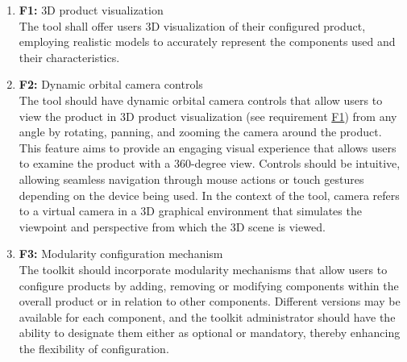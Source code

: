 \begin{enumerate}
\item \textbf{F1:} \label{itm:F1} 3D product visualization
\vspace{2pt}
\\The tool shall offer users 3D visualization of their configured product, employing realistic models to accurately represent the components used and their characteristics.
\vspace{4pt}

\item \textbf{F2:} \label{itm:F2} Dynamic orbital camera controls
\vspace{2pt}
\\The tool should have dynamic orbital camera controls that allow users to view the product in 3D product visualization (see requirement \hyperref[itm:F1]{F1}) from any angle by rotating, panning, and zooming the camera around the product. This feature aims to provide an engaging visual experience that allows users to examine the product with a 360-degree view. Controls should be intuitive, allowing seamless navigation through mouse actions or touch gestures depending on the device being used. In the context of the tool, camera refers to a virtual camera in a 3D graphical environment that simulates the viewpoint and perspective from which the 3D scene is viewed.
\vspace{4pt}

\item \textbf{F3:} \label{itm:F3} Modularity configuration mechanism
\vspace{2pt}
\\The toolkit should incorporate modularity mechanisms that allow users to configure products by adding, removing or modifying components within the overall product or in relation to other components. Different versions may be available for each component, and the toolkit administrator should have the ability to designate them either as optional or mandatory, thereby enhancing the flexibility of configuration.
\vspace{4pt}


\end{enumerate}
